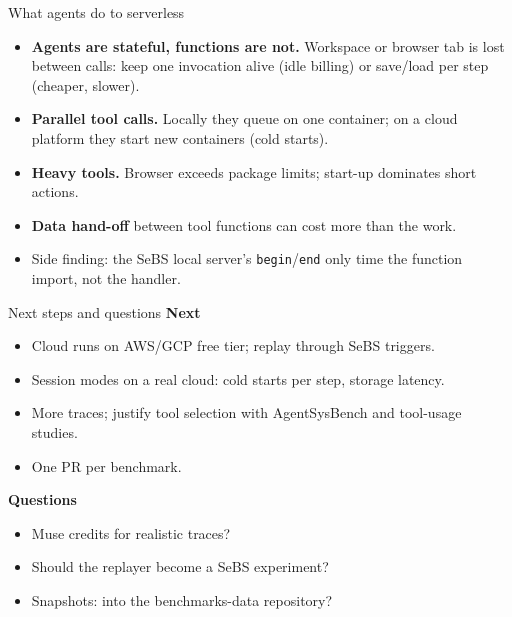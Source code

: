 \documentclass[aspectratio=169,11pt]{beamer}
\begin{document}
\begin{frame}{What agents do to serverless}
  \begin{itemize}
    \item \textbf{Agents are stateful, functions are not.} Workspace or browser tab is lost
          between calls: keep one invocation alive (idle billing) or save/load per step (cheaper, slower).
    \item \textbf{Parallel tool calls.} Locally they queue on one container;
          on a cloud platform they start new containers (cold starts).
    \item \textbf{Heavy tools.} Browser exceeds package limits; start-up dominates short actions.
    \item \textbf{Data hand-off} between tool functions can cost more than the work.
    \item Side finding: the SeBS local server's \texttt{begin}/\texttt{end} only time the
          function import, not the handler.
  \end{itemize}
\end{frame}

\begin{frame}{Next steps and questions}
  \textbf{Next}
  \begin{itemize}
    \item Cloud runs on AWS/GCP free tier; replay through SeBS triggers.
    \item Session modes on a real cloud: cold starts per step, storage latency.
    \item More traces; justify tool selection with AgentSysBench and tool-usage studies.
    \item One PR per benchmark.
  \end{itemize}
  \textbf{Questions}
  \begin{itemize}
    \item Muse credits for realistic traces?
    \item Should the replayer become a SeBS experiment?
    \item Snapshots: into the benchmarks-data repository?
  \end{itemize}
\end{frame}
\end{document}
